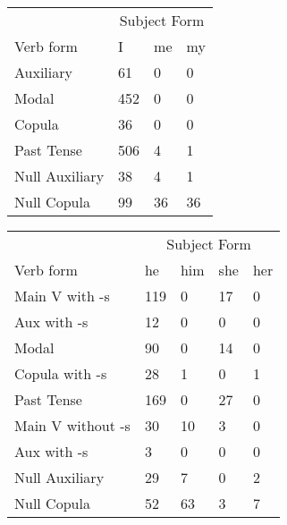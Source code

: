 \begin{table}[]
    \begin{minipage}{0.5\textwidth}
    \centering
    \begin{tabular}{@{}llll@{}}
        \toprule
            &\multicolumn{3}{c}{Subject Form}\\
            \cline{2-4}
        Verb form & I & me & my \\
        \midrule
        Auxiliary & 61 & 0 & 0 \\
        Modal & 452 & 0 & 0 \\
        Copula & 36 & 0 & 0 \\
        Past Tense & 506 & 4 & 1 \\
        \hline
        Null Auxiliary & 38 & 4 & 1 \\
        Null Copula & 99 & 36 & 36 \\
        \bottomrule
    \end{tabular}
\end{minipage}
\begin{minipage}{0.5\textwidth}
    \centering
    \begin{tabular}{@{}lllll@{}}
        \toprule
            &\multicolumn{4}{c}{Subject Form}\\
            \cline{2-5}
        Verb form & he & him & she & her \\
        \midrule
        Main V with -s & 119 & 0 & 17 & 0 \\
        Aux with -s & 12 & 0 & 0 & 0 \\
        Modal & 90 & 0 & 14 & 0 \\
        Copula with -s & 28 & 1 & 0 & 1 \\
        Past Tense & 169 & 0 & 27 & 0 \\
        \hline
        Main V without -s & 30 & 10 & 3 & 0 \\
        Aux with -s & 3 & 0 & 0 & 0 \\
        Null Auxiliary & 29 & 7 & 0 & 2 \\
        Null Copula & 52 & 63 & 3 & 7 \\
        \bottomrule
    \end{tabular}
\end{minipage}
\end{table}

